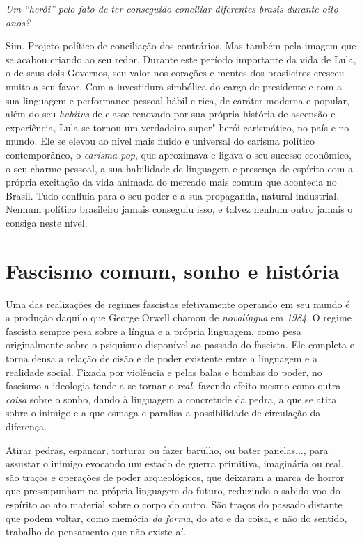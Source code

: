 \medskip

\noindent\emph{Um ``herói'' pelo fato de ter conseguido conciliar diferentes brasis
durante oito anos?}

\noindent Sim. Projeto político de conciliação dos contrários. Mas também pela
imagem que se acabou criando ao seu redor. Durante este período
importante da vida de Lula, o de seus dois Governos, seu valor nos
corações e mentes dos brasileiros cresceu muito a seu favor. Com a
investidura simbólica do cargo de presidente e com a sua linguagem e
performance pessoal hábil e rica, de caráter moderna e popular, além do
seu \emph{habitus} de classe renovado por sua própria história de
ascensão e experiência, Lula se tornou um verdadeiro super"-herói
carismático, no país e no mundo. Ele se elevou ao nível mais fluido e
universal do carisma político contemporâneo, o \emph{carisma pop}, que
aproximava e ligava o seu sucesso econômico, o seu charme pessoal, a sua
habilidade de linguagem e presença de espírito com a própria excitação
da vida animada do mercado mais comum que acontecia no Brasil. Tudo
confluía para o seu poder e a sua propaganda, natural industrial. Nenhum
político brasileiro jamais conseguiu isso, e talvez nenhum outro jamais
o consiga neste nível.

\chapter{Fascismo comum, sonho e história}

Uma das realizações de regimes fascistas efetivamente operando em seu
mundo é a produção daquilo que George Orwell chamou de \emph{novalíngua}
em \emph{1984}. O regime fascista sempre pesa sobre a
língua e a própria linguagem, como pesa originalmente sobre o psiquismo
disponível ao passado do fascista. Ele completa e torna densa a relação
de cisão e de poder existente entre a linguagem e a realidade social.
Fixada por violência e pelas balas e bombas do poder, no fascismo a
ideologia tende a se tornar o \emph{real}, fazendo efeito mesmo como
outra \emph{coisa} sobre o sonho, dando à linguagem a concretude da
pedra, a que se atira sobre o inimigo e a que esmaga e paralisa a
possibilidade de circulação da diferença.

Atirar pedras, espancar, torturar ou fazer barulho, ou bater panelas...,
para assustar o inimigo evocando um estado de guerra primitiva,
imaginária ou real, são traços e operações de poder arqueológicos, que
deixaram a marca de horror que pressupunham na própria linguagem do
futuro, reduzindo o sabido voo do espírito ao ato material sobre o corpo
do outro. São traços do passado distante que podem voltar, como memória
\emph{da forma}, do ato e da coisa, e não do sentido, trabalho do
pensamento que não existe aí.


